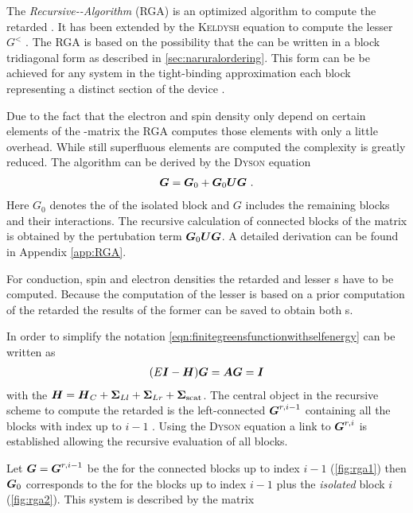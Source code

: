 \label{sec:rgapresentation}
The \emph{Recursive-\gfnc-Algorithm} (RGA) \cite{MacKinnon1985} is an optimized algorithm to compute the retarded \gfnc{}. It has been extended by the \textsc{Keldysh} equation to compute the lesser \gfnc{} $G^<$ \cite{JApplPhys.91.2343}.
The RGA is based on the possibility that the \hamil{} can be written in a block tridiagonal form as described in \cref{sec:naruralordering}.
This form can be be achieved for any system in the tight-binding approximation  each block representing a distinct section of the device \cite{Wimmer2009Thesis}.\par
Due to the fact that the electron and spin density only depend on certain elements of the \gfnc-matrix the RGA computes those elements with only a little overhead. While still superfluous elements are computed the complexity is greatly reduced. The algorithm can be derived by the \textsc{Dyson} equation
\begin{align}
	\boldsymbol{G} = \boldsymbol{G}_0+\boldsymbol{G}_0\boldsymbol{U}\boldsymbol{G}\ .
	\label{eqn:DysonEquationG}
\end{align}
Here $G_0$ denotes the \gfnc{} of the isolated block and $G$ includes the remaining blocks and their interactions. The recursive calculation of connected blocks of the \gfnc{} matrix is obtained by the pertubation term $\boldsymbol{G}_0\boldsymbol{U}\boldsymbol{G}$. A detailed derivation can be found in Appendix \ref{app:RGA}.\par
For conduction, spin and electron densities the retarded and lesser \gfnc s have to be computed. Because the computation of the lesser \gfnc{} is based on a prior computation of the retarded \gfnc{} the results of the former can be saved to obtain both \gfnc s.\par
In order to simplify the notation \cref{eqn:finitegreensfunctionwithselfenergy} can be written as
\begin{align}
(E\boldsymbol{I}-\boldsymbol{H})\boldsymbol{G} = \boldsymbol{A}\boldsymbol{G}=\boldsymbol{I}
\label{eqn:amatrix}
\end{align}
with the \hamil{} $\boldsymbol{H}=\boldsymbol{H}_C +\boldsymbol{\Sigma}_{Ll}+\boldsymbol{\Sigma}_{Lr}+\boldsymbol{\Sigma}_{\text{scat}} $.
The central object in the recursive scheme to compute the retarded \gfnc{} is the left-connected \gfnc{} $\boldsymbol{G}^{r,i-1}$ containing all the blocks with index up to $i-1$ \cite{JApplPhys.91.2343}. Using the \textsc{Dyson} equation a link to $\boldsymbol{G}^{r,i}$ is established allowing the recursive evaluation of all blocks.\par
Let $\boldsymbol{G}=\boldsymbol{G}^{r,i-1}$ be the \gfnc{} for the connected blocks up to index $i-1$ (\cref{fig:rga1}) then $\boldsymbol{G}_0$ corresponds to the \gfnc{} for the blocks up to index $i-1$ plus the \emph{isolated} block $i$ (\cref{fig:rga2}). This system is described by the matrix
